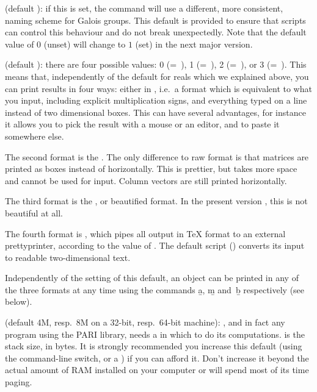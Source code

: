  (default ): if
this is set, the  command will use a different, more
consistent, naming scheme for Galois groups. This default is provided to
ensure that scripts can control this behaviour and do not break unexpectedly.
Note that the default value of $0$ (unset) will change to $1$ (set) in the
next major version.

 (default ): there are four possible values: 0
(=~), 1 (=~), 2 (=~), or 3
(=~). This
means that, independently of the default  for reals which we
explained above, you can print results in four ways: either in , i.e.~a format which is equivalent to what you input, including
explicit multiplication signs, and everything typed on a line instead of
two dimensional boxes. This can have several advantages, for instance it
allows you to pick the result with a mouse or an editor, and to paste it
somewhere else.\label{se:output}

The second format is the . The only difference to
raw format is that matrices are printed as boxes instead of horizontally.
This is prettier, but takes more space and cannot be used for input. Column
vectors are still printed horizontally.

The third format is the , or beautified format. In
the present version \vers, this is not beautiful at all.

The fourth format is , which pipes
all  output in TeX format to an external prettyprinter, according to the
value of . The default script () converts
its input to readable two-dimensional text.

Independently of the setting of this default, an object can be printed
in any of the three formats at any time using the commands \b{a}, \b{m}
and~\b{b} respectively (see below).

\label{se:parisize} (default 4M, resp.~8M on a 32-bit,
resp.~64-bit machine): , and in fact any program using the PARI
library, needs a  in which to do its computations. 
is the stack size, in bytes. It is strongly recommended you increase this
default (using the  command-line switch, or a ) if you can
afford it. Don't increase it beyond the actual amount of RAM installed on
your computer or  will spend most of its time paging.

